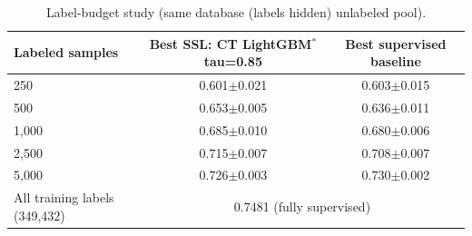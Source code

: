 \begin{table}[H]
\centering\small
\begin{tabular}{lcc}
\toprule
Labeled samples & Best SSL: CT LightGBM$^*$ tau=0.85 & Best supervised baseline\\
\midrule
250 & 0.601$\pm$0.021 & 0.603$\pm$0.015 \\
500 & 0.653$\pm$0.005 & 0.636$\pm$0.011 \\
1,000 & 0.685$\pm$0.010 & 0.680$\pm$0.006 \\
2,500 & 0.715$\pm$0.007 & 0.708$\pm$0.007 \\
5,000 & 0.726$\pm$0.003 & 0.730$\pm$0.002 \\
\midrule
All training labels (349,432) & \multicolumn{2}{c}{0.7481 (fully supervised)}\\
\bottomrule
\end{tabular}
\caption*{Label-budget study (same database (labels hidden) unlabeled pool).}
\end{table}
